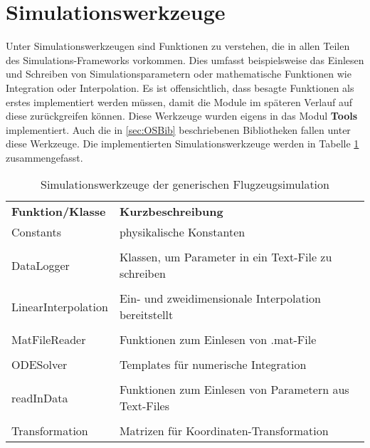 \section{Simulationswerkzeuge}
Unter Simulationswerkzeugen sind Funktionen zu verstehen, die in allen Teilen des Simulations-Frameworks vorkommen. Dies umfasst beispielsweise das Einlesen und Schreiben von Simulationsparametern oder mathematische Funktionen wie Integration oder Interpolation. Es ist offensichtlich, dass besagte Funktionen als erstes implementiert werden müssen, damit die Module im späteren Verlauf auf diese zurückgreifen können. Diese Werkzeuge wurden eigens in das Modul \textbf{Tools} implementiert. Auch die in \ref{sec:OSBib} beschriebenen Bibliotheken fallen unter diese Werkzeuge. Die implementierten Simulationswerkzeuge werden in Tabelle \ref{tab: SimWerk} zusammengefasst.
\begin{table}[h]
\centering	\begin{tabular}{lp{11cm}}
		\textbf{Funktion/Klasse} & \textbf{Kurzbeschreibung}\\
		 Constants & physikalische Konstanten\\\\
		 DataLogger & Klassen, um Parameter in ein Text-File zu schreiben\\\\
		 LinearInterpolation & Ein- und zweidimensionale Interpolation bereitstellt\\\\
		 MatFileReader & Funktionen zum Einlesen von .mat-File\\\\
		 ODESolver & Templates für numerische Integration\\\\
		 readInData & Funktionen zum Einlesen von Parametern aus Text-Files\\\\
		 Transformation & Matrizen für Koordinaten-Transformation
	\end{tabular}
\label{tab: SimWerk}
\caption{Simulationswerkzeuge der generischen Flugzeugsimulation}
\end{table}
\newpage

